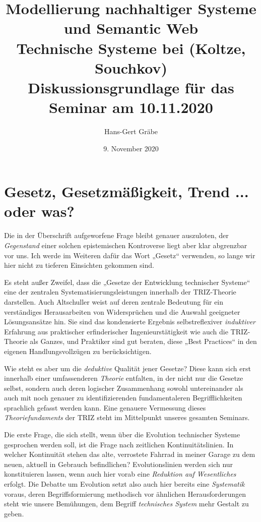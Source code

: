 \documentclass[11pt,a4paper]{article}
\title{Modellierung nachhaltiger Systeme und Semantic Web\\[6pt] Technische
  Systeme bei (Koltze, Souchkov) \\[6pt]\Large Diskussionsgrundlage für das
  Seminar am 10.11.2020}
\author{Hans-Gert Gr\"abe}
\date{9. November 2020}
\begin{document}
\maketitle

\section{Gesetz, Gesetzmäßigkeit, Trend ... oder was?}

Die in der Überschrift aufgeworfene Frage bleibt genauer auszuloten, der
\emph{Gegenstand} einer solchen epistemischen Kontroverse liegt aber klar
abgrenzbar vor uns. Ich werde im Weiteren dafür das Wort „Gesetz“ verwenden,
so lange wir hier nicht zu tieferen Einsichten gekommen sind.

Es steht außer Zweifel, dass die „Gesetze der Entwicklung technischer Systeme“
eine der zentralen Systematisierungsleistungen innerhalb der TRIZ-Theorie
darstellen. Auch Altschuller \cite[S. 25 unten]{Altschuller1984} weist auf
deren zentrale Bedeutung für ein verständiges Herausarbeiten von Widersprüchen
und die Auswahl geeigneter Lösungsansätze hin.  Sie sind das kondensierte
Ergebnis selbstreflexiver \emph{induktiver} Erfahrung aus praktischer
erfinderischer Ingenieurstätigkeit wie auch die TRIZ-Theorie als Ganzes, und
Praktiker sind gut beraten, diese „Best Practices“ in den eigenen
Handlungsvollzügen zu berücksichtigen.

Wie steht es aber um die \emph{deduktive} Qualität jener Gesetze?  Diese kann
sich erst innerhalb einer umfassenderen \emph{Theorie} entfalten, in der nicht
nur die Gesetze selbst, sondern auch deren logischer Zusammenhang sowohl
untereinander als auch mit noch genauer zu identifizierenden fundamentaleren
Begriff\-lichkeiten sprachlich gefasst werden kann. Eine genauere Vermessung
dieses \emph{Theoriefundaments} der TRIZ steht im Mittelpunkt unseres
gesamten Seminars.

Die erste Frage, die sich stellt, wenn über die Evolution technischer Systeme
gesprochen werden soll, ist die Frage nach zeitlichen Kontinuitätslinien.  In
welcher Kontinuität stehen das alte, verrostete Fahrrad in meiner Garage zu
dem neuen, aktuell in Gebrauch befindlichen? Evolutionslinien werden sich nur
konstituieren lassen, wenn auch hier vorab eine \emph{Reduktion auf
  Wesentliches} erfolgt. Die Debatte um Evolution setzt also auch hier bereits
eine \emph{Systematik} voraus, deren Begriffsformierung methodisch vor
ähnlichen Herausforderungen steht wie unsere Bemühungen, dem Begriff
\emph{technisches System} mehr Gestalt zu geben.
\end{document}
